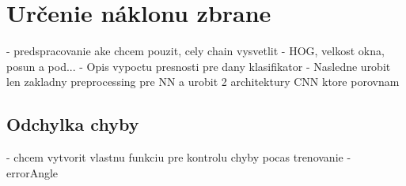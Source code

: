 
\section{Určenie náklonu zbrane}
- predspracovanie ake chcem pouzit, cely chain vysvetlit
- HOG, velkost okna, posun a pod...
- Opis vypoctu presnosti pre dany klasifikator
- Nasledne urobit len zakladny preprocessing pre NN a urobit 2 architektury CNN ktore porovnam

\subsection{Odchylka chyby}
- chcem vytvorit vlastnu funkciu pre kontrolu chyby pocas trenovanie - errorAngle
